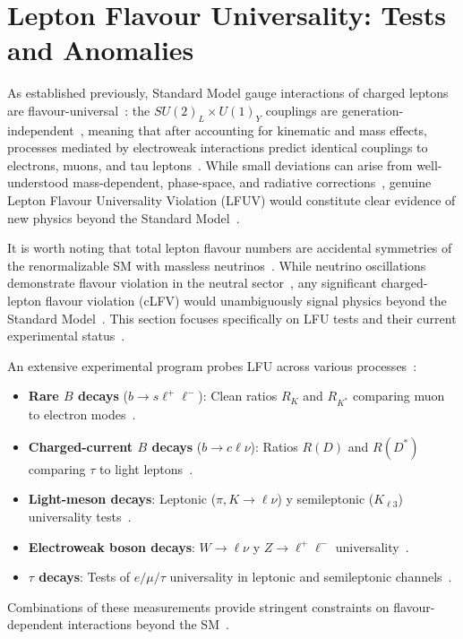 \section{Lepton Flavour Universality: Tests and Anomalies}\label{sec:LFU}

As established previously, Standard Model gauge interactions of charged leptons are flavour-universal~\cite{gl1961579,PhysRevLett.19.1264,1674-1137-40-10-100001}: the $SU(2)_L\times U(1)_Y$ couplings are generation-independent~\cite{gl1961579,PhysRevLett.19.1264}, meaning that after accounting for kinematic and mass effects, processes mediated by electroweak interactions predict identical couplings to electrons, muons, and tau leptons~\cite{1674-1137-40-10-100001}. While small deviations can arise from well-understood mass-dependent, phase-space, and radiative corrections~\cite{1674-1137-40-10-100001}, genuine Lepton Flavour Universality Violation (LFUV) would constitute clear evidence of new physics beyond the Standard Model~\cite{Hiller:2014yaa,Dorsner:2016wpm,Buttazzo:2017ixm}.

It is worth noting that total lepton flavour numbers are accidental symmetries of the renormalizable SM with massless neutrinos~\cite{1674-1137-40-10-100001}. While neutrino oscillations demonstrate flavour violation in the neutral sector~\cite{SuperK:1998osc,SNO:2002NC}, any significant charged-lepton flavour violation (cLFV) would unambiguously signal physics beyond the Standard Model~\parencite{1674-1137-40-10-100001}. This section focuses specifically on LFU tests and their current experimental status~\cite{1674-1137-40-10-100001,Ciuchini:2022wbq}.

An extensive experimental program probes LFU across various processes~\cite{1674-1137-40-10-100001}:
\begin{itemize}
  \item \textbf{Rare $B$ decays} ($b\to s\ell^+\ell^-$): Clean ratios $R_K$ and $R_{K^*}$ comparing muon to electron modes~\cite{LHCb:2014vgu,LHCb:2017avl,LHCb:2019hip,LHCb:2021trn,LHCb:2022qnv,LHCb:2022zom,Hiller:2014yaa}.
  \item \textbf{Charged-current $B$ decays} ($b\to c\ell\nu$): Ratios $R(D)$ and $R(D^*)$ comparing $\tau$ to light leptons~\cite{BaBar:2012obs,BaBar:2013mob,Belle:2015qfa,LHCb:2015gmp,LHCb:2017rln,LHCb:2023zxo,Amhis_2021}.
  \item \textbf{Light-meson decays}: Leptonic ($\pi, K\to \ell\nu$) y semileptonic ($K_{\ell3}$) universality tests~\cite{1674-1137-40-10-100001,Antonelli:2010}.
  \item \textbf{Electroweak boson decays}: $W\to \ell\nu$ y $Z\to \ell^+\ell^-$ universality~\cite{atlas2020test,LEPEW:2006}.
  \item \textbf{$\tau$ decays}: Tests of $e/\mu/\tau$ universality in leptonic and semileptonic channels~\cite{1674-1137-40-10-100001,Amhis_2021}.
\end{itemize}
Combinations of these measurements provide stringent constraints on flavour-dependent interactions beyond the SM~\parencite{1674-1137-40-10-100001}.

